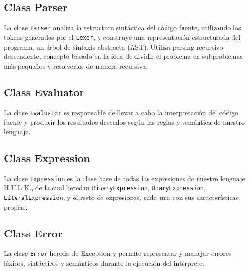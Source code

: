 \documentclass[12pt,a4paper]{article}
\begin{document}
\subsection{Class Parser}
La clase \texttt{Parser} analiza la estructura sintáctica del código fuente, utilizando los tokens generados por el \texttt{Lexer}, y construye una representación estructurada del programa, un árbol de sintaxis abstracta (AST). Utiliza parsing recursivo descendente, concepto basado en la idea de dividir el problema en subproblemas más pequeños y resolverlos de manera recursiva.
\subsection{Class Evaluator}
La clase \texttt{Evaluator} es responsable de llevar a cabo la interpretación del código fuente y producir los resultados deseados según las reglas y semántica de nuestro lenguaje.
\subsection{Class Expression}
La clase \texttt{Expression} es la clase base de todas las expresiones de nuestro lenguaje H.U.L.K., de la cual heredan \texttt{BinaryExpression}, \texttt{UnaryExpression}, \texttt{LiteralExpression}, y el resto de expresiones, cada una con sus características propias.
\subsection{Class Error}
La clase \texttt{Error} hereda de Exception y permite representar y manejar errores léxicos, sintácticos y semánticos durante la ejecución del intérprete.
\end{document}
